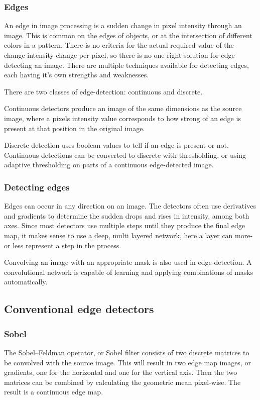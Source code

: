\documentclass[a4paper]{article}
\begin{document}
\subsubsection{Edges}
An edge in image processing is a sudden change in pixel intensity through an image. This is common on the edges of objects, or at the intersection of different colors in a pattern. There is no criteria for the actual required value of the change intensity-change per pixel, so there is no one right solution for edge detecting an image. There are multiple techniques available for detecting edges, each having it's own strengths and weaknesses.\par
There are two classes of edge-detection: continuous and discrete.\par
Continuous detectors produce an image of the same dimensions as the source image, where a pixels intensity value corresponds to how strong of an edge is present at that position in the original image.\par
Discrete detection uses boolean values to tell if an edge is present or not. Continuous detections can be converted to discrete with thresholding, or using adaptive thresholding on parts of a continuous edge-detected image.
\subsubsection{Detecting edges}
Edges can occur in any direction on an image. The detectors often use derivatives and gradients to determine the sudden drops and rises in intensity, among both axes. Since most detectors use multiple steps until they produce the final edge map, it makes sense to use a deep, multi layered network, here a layer can more-or less represent a step in the process.\par
Convolving an image with an appropriate mask is also used in edge-detection. A convolutional network is capable of learning and applying combinations of masks automatically.
\subsection{Conventional edge detectors}
\subsubsection{Sobel}
The Sobel–Feldman operator, or Sobel filter consists of two discrete matrices to be convolved with the source image. This will result in two edge map images, or gradients, one for the horizontal and one for the vertical axis. Then the two matrices can be combined by calculating the geometric mean pixel-wise. The result is a continuous edge map.
\end{document}
